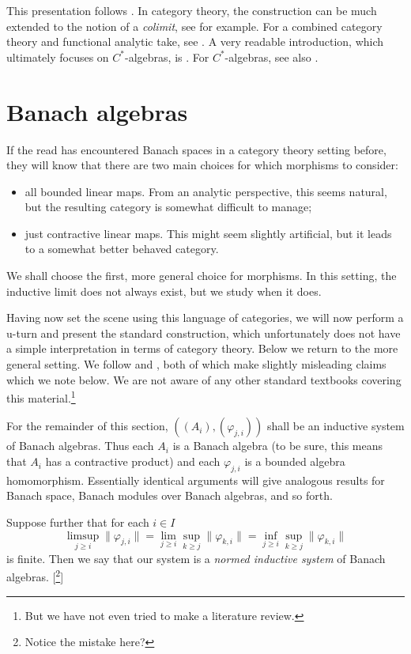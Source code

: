 \documentclass[a4paper,11pt]{article}
\theoremstyle{definition}
\begin{document}
This presentation follows \cite[Section~6.2]{rll}.  In category theory, the construction can be
much extended to the notion of a \emph{colimit}, see \cite[Chapter~5]{leinster} for example.  For
a combined category theory and functional analytic take, see \cite{cas}.
A very readable introduction, which ultimately focuses on $C^*$-algebras, is \cite[Appendix~L]{wo}.
For $C^*$-algebras, see also \cite[Section~II.8.2]{blenc}.


\section{Banach algebras}

If the read has encountered Banach spaces in a category theory setting before, they will know that
there are two main choices for which morphisms to consider:
\begin{itemize}
\item all bounded linear maps.  From an analytic perspective, this seems natural, but the resulting
category is somewhat difficult to manage;
\item just contractive linear maps.  This might seem slightly artificial, but it leads to a somewhat
better behaved category.
\end{itemize}

We shall choose the first, more general choice for morphisms.  In this setting, the inductive limit
does not always exist, but we study when it does.

Having now set the scene using this language of categories, we will now perform a u-turn and present
the standard construction, which unfortunately does not have a simple interpretation in terms of
category theory.  Below we return to the more general setting.  We follow
\cite[Definition~1.3.4]{palmer} and \cite[Section~3.3]{blackadar}, both of which make slightly
misleading claims which we note below.  We are not aware of any other standard textbooks covering
this material.\footnote{But we have not even tried to make a literature review.}

For the remainder of this section, $((A_i), (\varphi_{j,i}))$ shall be an inductive system of Banach
algebras.  Thus each $A_i$ is a Banach algebra (to be sure, this means that $A_i$ has a contractive
product) and each $\varphi_{j,i}$ is a bounded algebra homomorphism.  Essentially identical
arguments will give analogous results for Banach space, Banach modules over Banach algebras, and so
forth.

Suppose further that for each $i\in I$
\[ \limsup_{j\geq i} \|\varphi_{j,i}\| = \lim_{j\geq i} \sup_{k\geq j} \|\varphi_{k,i}\|
=
\inf_{j\geq i} \sup_{k\geq j} \|\varphi_{k,i}\| \]
is finite.  Then we say that our system is a \emph{normed inductive system} of Banach algebras.
[\footnote{Notice the mistake here?}]
\end{document}
